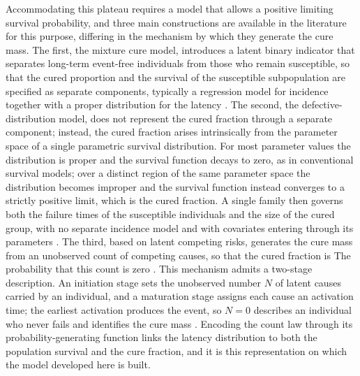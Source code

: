 {
Accommodating this plateau requires a model that allows a positive
limiting survival probability, and three main constructions are available
in the literature for this purpose, differing in the mechanism by which
they generate the cure mass. The first, the mixture cure model,
introduces a latent binary indicator that separates long-term event-free
individuals from those who remain susceptible, so that the cured
proportion and the survival of the susceptible subpopulation are
specified as separate components, typically a regression model for
incidence together with a proper distribution for the latency
\cite{boag1949,berkson1952,farewell1982,sy2000}. The second, the
defective-distribution model, does not represent the cured fraction
through a separate component; instead, the cured fraction arises
intrinsically from the parameter space of a single parametric survival
distribution. For most parameter values the distribution is proper and
the survival function decays to zero, as in conventional survival models;
over a distinct region of the same parameter space the distribution
becomes improper and the survival function instead converges to a
strictly positive limit, which is the cured fraction. A single family
then governs both the failure times of the susceptible individuals and
the size of the cured group, with no separate incidence model and with
covariates entering through its parameters
\cite{balka2009,rocha2017,scudilio2019}. The third, based on latent
competing risks, generates the cure mass from an unobserved count of
competing causes, so that the cured fraction is The probability that this
count is zero \cite{yakovlev1996,chen1999,tsodikov2003,rodrigues2009unif}.
} %
{
This mechanism admits a two-stage description. An initiation stage sets
the unobserved number $N$ of latent causes carried by an individual, and
a maturation stage assigns each cause an activation time; the earliest
activation produces the event, so $N=0$ describes an individual who never
fails and identifies the cure mass \cite{rodrigues2025}. Encoding the
count law through its probability-generating function links the latency
distribution to both the population survival and the cure fraction, and
it is this representation on which the model developed here is built.
}

